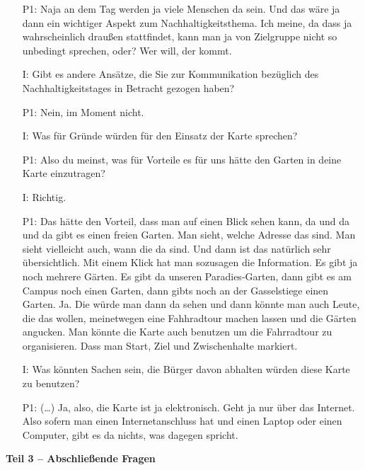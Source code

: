 \begin{itemize}
	\item[P1:] Naja an dem Tag werden ja viele Menschen da sein. Und das w{\"a}re ja dann ein wichtiger Aspekt zum Nachhaltigkeitsthema. Ich meine, da dass ja wahrscheinlich drau{\ss}en stattfindet, kann man ja von Zielgruppe nicht so unbedingt sprechen, oder? Wer will, der kommt.
	\item[I:] Gibt es andere Ans{\"a}tze, die Sie zur Kommunikation bez{\"u}glich des Nachhaltigkeitstages in Betracht gezogen haben?
	\item[P1:] Nein, im Moment nicht.
	\item[I:] Was f{\"u}r Gr{\"u}nde w{\"u}rden f{\"u}r den Einsatz der Karte sprechen? 
    \item[P1:] Also du meinst, was f{\"u}r Vorteile es f{\"u}r uns h{\"a}tte den Garten in deine Karte einzutragen?
    \item[I:] Richtig.
	\item[P1:] Das h{\"a}tte den Vorteil, dass man auf einen Blick sehen kann, da und da und da gibt es einen freien Garten. Man sieht, welche Adresse das sind. Man sieht vielleicht auch, wann die da sind. Und dann ist das nat{\"u}rlich sehr {\"u}bersichtlich. Mit einem Klick hat man sozusagen die Information. Es gibt ja noch mehrere G{\"a}rten. Es gibt da unseren Paradies-Garten, dann gibt es am Campus noch einen Garten, dann gibts noch an der Gasselstiege einen Garten. Ja. Die w{\"u}rde man dann da sehen und dann k{\"o}nnte man auch Leute, die das wollen, meinetwegen eine Fahhradtour machen lassen und die G{\"a}rten angucken. Man k{\"o}nnte die Karte auch benutzen um die Fahrradtour zu organisieren. Dass man Start, Ziel und Zwischenhalte markiert.
	\item[I:] Was k{\"o}nnten Sachen sein, die B{\"u}rger davon abhalten w{\"u}rden diese Karte zu benutzen?
	\item[P1:] (\dots) Ja, also, die Karte ist ja elektronisch. Geht ja nur {\"u}ber das Internet. Also sofern man einen Internetanschluss hat und einen Laptop oder einen Computer, gibt es da nichts, was dagegen spricht.
\end{itemize}
\textbf{Teil 3 -- Abschlie{\ss}ende Fragen}
